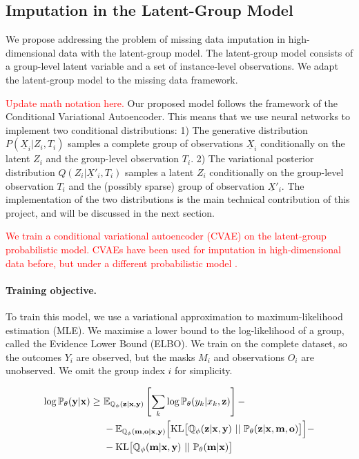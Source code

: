 \documentclass[a4paper,12pt,twoside,openright]{article}
\newcommand{\crit}[1]{\textcolor{red}{#1}}
\begin{document}
\subsection{Imputation in the Latent-Group Model}

We propose addressing the problem of missing data imputation in high-dimensional data with the latent-group model. The latent-group model consists of a group-level latent variable and a set of instance-level observations. We adapt the latent-group model to the missing data framework. 

\crit{Update math notation here.} Our proposed model follows the framework of the Conditional Variational Autoencoder. This means that we use neural networks to implement two conditional distributions: 1) The generative distribution $P(\underline{X}_i | Z_i, T_i)$ samples a complete group of observations $\underline{X}_i$ conditionally on the latent $Z_i$ and the group-level observation $T_i$. 2) The variational posterior distribution $Q(Z_i | \underline{X}'_i, T_i)$ samples a latent $Z_i$ conditionally on the group-level observation $T_i$ and the (possibly sparse) group of observation $\underline{X}'_i$. The implementation of the two distributions is the main technical contribution of this project, and will be discussed in the next section.

\crit{We train a conditional variational autoencoder (CVAE) on the latent-group probabilistic model. CVAEs have been used for imputation in high-dimensional data before, but under a different probabilistic model \parencite{nazabalHandlingIncompleteHeterogeneous2020, garneloConditionalNeuralProcesses2018}.}

\paragraph{Training objective.} To train this model, we use a variational approximation to maximum-likelihood estimation (MLE). We maximise a lower bound to the log-likelihood of a group, called the Evidence Lower Bound (ELBO). We train on the complete dataset, so the outcomes $Y_i$ are observed, but the masks $M_i$ and observations $O_i$ are unobserved. We omit the group index $i$ for simplicity.

\begin{align*}
    \log \mathbb{P}_\theta (\mathbf{y} | \mathbf{x}) \geq ~ & \mathbb{E}_{\mathbb{Q}_\phi (\mathbf{z} | \mathbf{x}, \mathbf{y})} \left[ \sum_k \log \mathbb{P}_\theta (y_k | x_k, \mathbf{z})\right] - \\
    & - \mathbb{E}_{\mathbb{Q}_\phi (\mathbf{m}, \mathbf{o} | \mathbf{x}, \mathbf{y})} \Bigl[ \mathrm{KL} \bigl[ \mathbb{Q}_\phi (\mathbf{z} | \mathbf{x}, \mathbf{y}) ~||~ \mathbb{P}_\theta (\mathbf{z} | \mathbf{x}, \mathbf{m}, \mathbf{o}) \bigr] \Bigr] - \\
    & - \mathrm{KL} \bigl[ \mathbb{Q}_\phi (\mathbf{m} | \mathbf{x}, \mathbf{y}) ~||~ \mathbb{P}_\theta (\mathbf{m} | \mathbf{x}) \bigr]
\end{align*}
\end{document}
